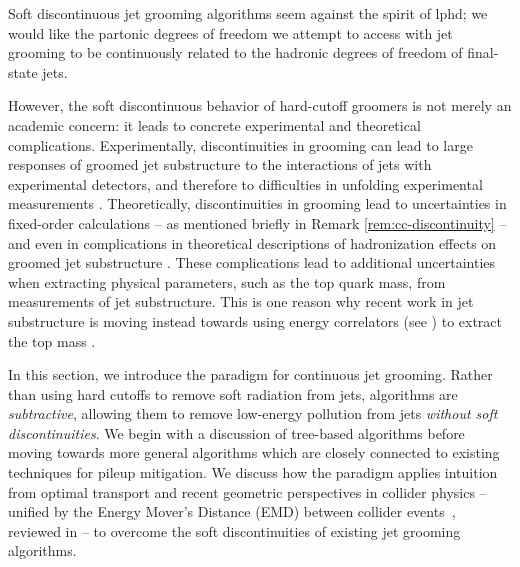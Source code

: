 Soft discontinuous jet grooming algorithms seem against the spirit of \gls{lphd};
%
we would like the partonic degrees of freedom we attempt to access with jet grooming to be continuously related to the hadronic degrees of freedom of final-state jets.

However, the soft discontinuous behavior of hard-cutoff groomers is not merely an academic concern:
%
it leads to concrete experimental and theoretical complications.
%
Experimentally, discontinuities in grooming can lead to large responses of groomed jet substructure to the interactions of jets with experimental detectors, and therefore to difficulties in unfolding experimental measurements \cite{ATL-PHYS-PUB-2019-027,Aad:2019vyi,ATLAS:2020gwe}.
%
Theoretically, discontinuities in grooming lead to uncertainties in fixed-order calculations \cite{Larkoski:2014wba} -- as mentioned briefly in Remark \ref{rem:cc-discontinuity} -- and even in complications in theoretical descriptions of \gls{hadronization} effects on groomed jet substructure \cite{Hoang:2019ceu}.
%
These complications lead to additional uncertainties when extracting physical parameters, such as the top quark mass, from measurements of jet substructure.
%
This is one reason why recent work in jet substructure is moving instead towards using energy correlators (see ) to extract the top mass \cite{Procura:2022fid,Holguin:2022epo,Holguin:2023bjf,Pathak:2023tmy,Xiao:2024rol,Holguin:2024tkz}.


In this section, we introduce the \PIRANHA{} paradigm for continuous jet grooming.
%
Rather than using hard cutoffs to remove soft radiation from jets, \PIRANHA{} algorithms are \textit{subtractive}, allowing them to remove low-energy pollution from jets \textit{without soft discontinuities}.
%
We begin with a discussion of tree-based \PIRANHA{} algorithms before moving towards more general algorithms which are closely connected to existing techniques for \gls{pileup} mitigation.
%
We discuss how the \PIRANHA{} paradigm applies intuition from optimal transport and recent geometric perspectives in collider physics -- unified by the Energy Mover's Distance (EMD) between collider events~\cite{Komiske:2019fks,Komiske:2020qhg}, reviewed in  -- to overcome the soft discontinuities of existing jet grooming algorithms.

